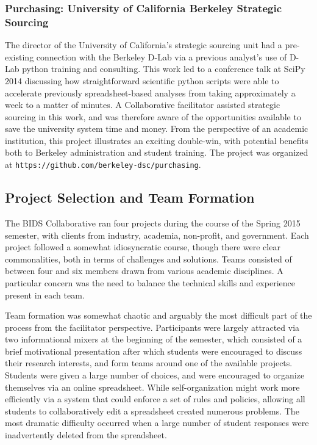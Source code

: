 \documentclass[12pt]{article}
\begin{document}
\subsubsection*{Purchasing: University of California Berkeley Strategic Sourcing}

The director of the University of California's strategic sourcing unit had a pre-existing connection with the Berkeley D-Lab via a previous analyst's use of D-Lab python training and consulting. This work led to a conference talk at SciPy 2014 discussing how straightforward scientific python scripts were able to accelerate previously spreadsheet-based analyses from taking approximately a week to a matter of minutes. A Collaborative facilitator assisted strategic sourcing in this work, and was therefore aware of the opportunities available to save the university system time and money. From the perspective of an academic institution, this project illustrates an exciting double-win, with potential benefits both to Berkeley administration and student training.  The project was organized at \texttt{https://github.com/berkeley-dsc/purchasing}.

\subsection{Project Selection and Team Formation}

The BIDS Collaborative ran four projects during the course of the Spring 2015 semester, with clients from industry, academia, non-profit, and government. Each project followed a somewhat idiosyncratic course, though there were clear commonalities, both in terms of challenges and solutions. Teams consisted of between four and six members drawn from various academic disciplines. A particular concern was the need to balance the technical skills and experience present in each team.

Team formation was somewhat chaotic and arguably the most difficult part of the process from the facilitator perspective. Participants were largely attracted via two informational mixers at the beginning of the semester, which consisted of a brief motivational presentation after which students were encouraged to discuss their research interests, and form teams around one of the available projects. Students were given a large number of choices, and were encouraged to organize themselves via an online spreadsheet. While self-organization might work more efficiently via a system that could enforce a set of rules and policies, allowing all students to collaboratively edit a spreadsheet created numerous problems. The most dramatic difficulty occurred when a large number of student responses were inadvertently deleted from the spreadsheet.
\end{document}
